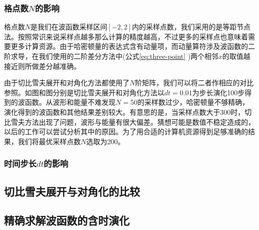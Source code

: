 \subsubsection{格点数$N$的影响}
格点数$N$是我们在波函数采样区间$\left[-2,2\right]$内的采样点数，我们采用的是等距节点法。按照常识来说采样点越多那么计算的精度越高，不过更多的采样点也意味着需要更多计算资源。由于哈密顿量的表达式含有动量项，而动量算符涉及波函数的二阶求导，在我们使用的二阶差分方法中(公式\ref{eq:three-point} )两个相邻$x$的取值越接近则所做差分越准确。

由于切比雪夫展开和对角化方法都使用了$N$阶矩阵，我们可以将二者作相应的对比参照。如图和图分别是切比雪夫展开和对角化方法以$dt=0.01$为步长演化100步得到的波函数。从波形和能量不难发现$N=50$的采样数过少，哈密顿量不够精确，演化得到的波函数和其他结果差别较大。有意思的是，当采样点数大于300时，切比雪夫方法出现了问题，波形与能量有很大偏差。猜想可能是数值不稳定造成的，以后的工作可以尝试分析其中的原因。为了用合适的计算机资源得到足够准确的结果，我们将最优采样点数$N$选取为200。



\subsubsection{时间步长$dt$的影响}


\subsection{切比雪夫展开与对角化的比较}


\subsection{精确求解波函数的含时演化} 
